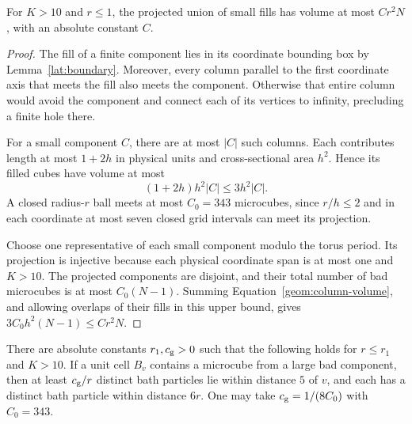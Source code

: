 \begin{lemma}\label{geom:small-fills}
For $K>10$ and $r\le1$, the projected union of small fills has volume at
most $C r^2 N$, with an absolute constant $C$.
\end{lemma}

\begin{proof}
The fill of a finite component lies in its coordinate bounding box by
Lemma~\ref{lat:boundary}. Moreover, every column parallel to the first
coordinate axis that meets the fill also meets the component. Otherwise
that entire column would avoid the component and connect each of its
vertices to infinity, precluding a finite hole there.

For a small component $C$, there are at most $|C|$ such columns. Each
contributes length at most $1+2h$ in physical units and cross-sectional
area $h^2$. Hence its filled cubes have volume at most
\begin{equation}\label{geom:column-volume}
 (1+2h)h^2|C|\le3h^2|C|.
\end{equation}
A closed radius-$r$ ball meets at most $C_0=343$ microcubes, since
$r/h\le2$ and in each coordinate at most seven closed grid intervals
can meet its projection.

Choose one representative of each small component modulo the torus
period. Its projection is injective because each physical coordinate span
is at most one and $K>10$. The projected components are disjoint, and their
total number of bad microcubes is at most $C_0(N-1)$. Summing
Equation~\eqref{geom:column-volume}, and allowing overlaps of their
fills in this upper bound, gives $3C_0h^2(N-1)\le C r^2N$.
\end{proof}

\begin{lemma}
\label{geom:large-witnesses}
There are absolute constants $r_1,c_{\rm g}>0$ such that the following
holds for $r\le r_1$ and $K>10$. If a unit cell $B_v$ contains a
microcube from a large bad component, then at least $c_{\rm g}/r$
distinct bath particles lie within distance $5$ of $v$, and each has a
distinct bath particle within distance $6r$.
One may take $c_{\rm g}=1/(8C_0)$ with $C_0=343$.
\end{lemma}


